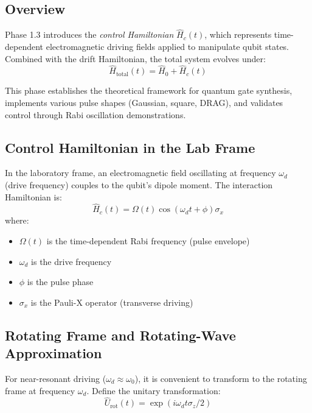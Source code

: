 \documentclass[11pt,a4paper]{article}
\theoremstyle{definition}
\theoremstyle{remark}
\begin{document}
\subsection{Overview}

Phase 1.3 introduces the \emph{control Hamiltonian} $\hat{H}_c(t)$, which represents time-dependent electromagnetic driving fields applied to manipulate qubit states. Combined with the drift Hamiltonian, the total system evolves under:
\begin{equation}
\hat{H}_{\text{total}}(t) = \hat{H}_0 + \hat{H}_c(t)
\end{equation}

This phase establishes the theoretical framework for quantum gate synthesis, implements various pulse shapes (Gaussian, square, DRAG), and validates control through Rabi oscillation demonstrations.

\subsection{Control Hamiltonian in the Lab Frame}

In the laboratory frame, an electromagnetic field oscillating at frequency $\omega_d$ (drive frequency) couples to the qubit's dipole moment. The interaction Hamiltonian is:
\begin{equation}
\hat{H}_c(t) = \Omega(t) \cos(\omega_d t + \phi) \sigma_x
\label{eq:control_lab}
\end{equation}
where:
\begin{itemize}
    \item $\Omega(t)$ is the time-dependent Rabi frequency (pulse envelope)
    \item $\omega_d$ is the drive frequency
    \item $\phi$ is the pulse phase
    \item $\sigma_x$ is the Pauli-X operator (transverse driving)
\end{itemize}

\subsection{Rotating Frame and Rotating-Wave Approximation}

For near-resonant driving ($\omega_d \approx \omega_0$), it is convenient to transform to the rotating frame at frequency $\omega_d$. Define the unitary transformation:
\begin{equation}
\hat{U}_{\text{rot}}(t) = \exp(i \omega_d t \sigma_z / 2)
\end{equation}
\end{document}
